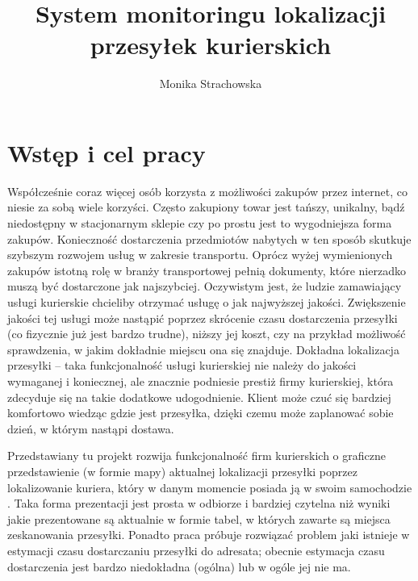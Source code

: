 \documentclass[eng,printmode,oneside]{mgr}
\title{System monitoringu lokalizacji przesyłek kurierskich}
\author{Monika Strachowska}
\begin{document}

\maketitle %


\tableofcontents %

\chapter{Wstęp i cel pracy}

Współcześnie coraz więcej osób korzysta z możliwości zakupów przez internet, co
niesie za sobą wiele korzyści. Często zakupiony towar jest tańszy, unikalny,
bądź niedostępny w stacjonarnym sklepie czy po prostu jest to wygodniejsza forma
zakupów. Konieczność dostarczenia przedmiotów nabytych w ten sposób skutkuje
szybszym rozwojem usług w zakresie transportu. Oprócz wyżej wymienionych zakupów
istotną rolę w branży transportowej pełnią dokumenty, które nierzadko muszą być
dostarczone jak najszybciej.
Oczywistym jest, że ludzie zamawiający usługi kurierskie chcieliby otrzymać
usługę o jak najwyższej jakości. Zwiększenie jakości tej usługi może nastąpić poprzez
skrócenie czasu dostarczenia przesyłki (co fizycznie już jest bardzo trudne),
niższy jej koszt, czy na przykład możliwość sprawdzenia, w jakim dokładnie
miejscu ona się znajduje. Dokładna lokalizacja przesyłki -- taka funkcjonalność
usługi kurierskiej nie należy do jakości wymaganej i koniecznej, ale znacznie podniesie prestiż firmy
kurierskiej, która zdecyduje się na takie dodatkowe udogodnienie. Klient może
czuć się bardziej komfortowo wiedząc gdzie jest przesyłka, dzięki czemu może
zaplanować sobie dzień, w którym nastąpi dostawa.

Przedstawiany tu projekt rozwija funkcjonalność firm kurierskich o
graficzne przedstawienie (w formie mapy) aktualnej lokalizacji przesyłki
poprzez lokalizowanie kuriera, który w danym momencie posiada ją
w swoim samochodzie .
Taka forma prezentacji jest prosta w odbiorze i bardziej czytelna niż wyniki
jakie prezentowane są aktualnie w formie tabel, w których zawarte są miejsca
zeskanowania przesyłki. Ponadto praca próbuje rozwiązać problem jaki istnieje w
estymacji czasu dostarczaniu przesyłki do adresata; obecnie estymacja czasu
dostarczenia jest bardzo niedokładna (ogólna) lub w ogóle jej nie ma.
\end{document}
